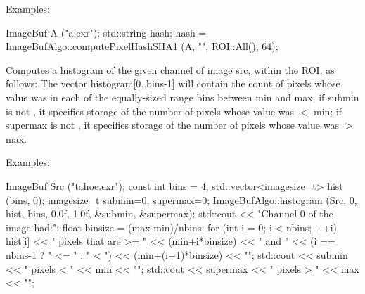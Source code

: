 \smallskip
\noindent Examples:
\begin{code}
    ImageBuf A ("a.exr");
    std::string hash;
    hash = ImageBufAlgo::computePixelHashSHA1 (A, "", ROI::All(), 64);
\end{code}
\apiend

 
Computes a histogram of the given {\cf channel} of image {\cf src},
within the ROI,
as follows: The vector {\cf histogram[0..bins-1]} will contain the
count of pixels whose value was in each of the equally-sized range
bins between {\cf min} and {\cf max}; if {\cf submin} is not \NULL,
it specifies storage of the number of pixels whose value was
$<$ {\cf min}; if {\cf supermax} is not \NULL, it specifies storage of
the number of pixels whose value was $>$ {\cf max}.

\smallskip
\noindent Examples:
\begin{code}
    ImageBuf Src ("tahoe.exr");
    const int bins = 4;
    std::vector<imagesize_t> hist (bins, 0);
    imagesize_t submin=0, supermax=0;
    ImageBufAlgo::histogram (Src, 0, hist, bins, 0.0f, 1.0f,
                             &submin, &supermax);
    std::cout << "Channel 0 of the image had:\n";
    float binsize = (max-min)/nbins;
    for (int i = 0;  i < nbins;  ++i)
        hist[i] << " pixels that are >= " << (min+i*binsize) << " and "
                << (i == nbins-1 ? " <= " : " < ")
                << (min+(i+1)*binsize) << "\n";
    std::cout << submin << " pixels < " << min << "\n";
    std::cout << supermax << " pixels > " << max << "\n";
\end{code}
\apiend

